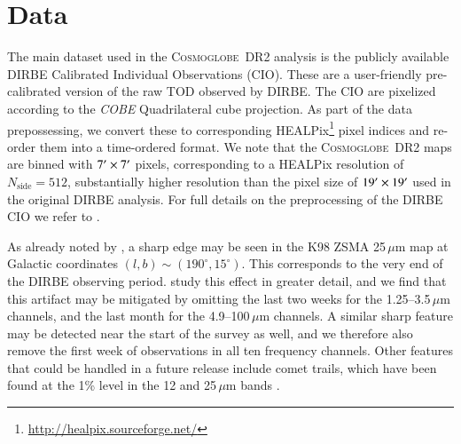 \documentclass[twocolumn]{aa}
\newcommand{\cosmoglobe}{\textsc{Cosmoglobe}}
\begin{document}
\section{Data}\label{sect:data}


The main dataset used in the \cosmoglobe\ DR2 analysis is the
publicly available DIRBE Calibrated Individual Observations
(CIO). These are a user-friendly pre-calibrated version of the raw TOD
observed by DIRBE. The CIO are pixelized according to the \textit{COBE}
Quadrilateral cube projection. As part of the data prepossessing, we
convert these to corresponding HEALPix\footnote{\url{http://healpix.sourceforge.net/}} 
\citep{healpix} pixel indices and re-order
them into a time-ordered format. We note that the \cosmoglobe\ DR2
maps are binned with $7\arcm \times 7\arcm$ pixels, corresponding to a
HEALPix resolution of $N_{\mathrm{side}}=512$, substantially 
higher resolution than the pixel size of $19\arcm \times 19\arcm$ used
in the original DIRBE analysis. For full details on the
preprocessing of the DIRBE CIO we refer to \cite{CG02_01}.

As already noted by \citet{kelsall1998}, a sharp edge may be seen in
the K98 ZSMA 25\,$\mu$m map at Galactic coordinates
$(l,b)\sim(190^{\circ},15^{\circ})$. This corresponds to the very end
of the DIRBE observing period. \citet{CG02_01} study this effect in
greater detail, and we find that this artifact may be mitigated by
omitting the last two weeks for the 1.25--3.5\,$\mu$m channels, and
the last month for the 4.9--100$\,\mu$m channels. A similar sharp
feature may be detected near the start of the survey as well, and we
therefore also remove the first week of observations in all ten frequency
channels. Other features that could be handled in a future release
include comet trails, which have been found at the 1\% level in the 12
and 25\,$\mu$m bands \citep{arendt}.
\end{document}
